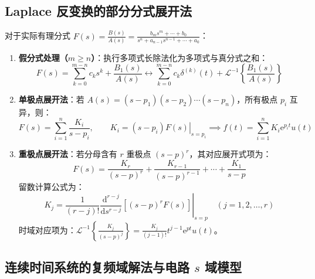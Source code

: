 \documentclass[11pt,a4paper,fontset=fandol]{ctexart}
\theoremstyle{remark}
\begin{document}
\subsection{Laplace 反变换的部分分式展开法}
对于实际有理分式 $F(s) = \frac{B(s)}{A(s)} = \frac{b_m s^m + \cdots + b_0}{s^n + a_{n-1}s^{n-1} + \cdots + a_0}$：
\begin{enumerate}
    \item \textbf{假分式处理（$m \ge n$）}：执行多项式长除法化为多项式与真分式之和：
    \begin{equation}
        F(s) = \sum_{k=0}^{m-n} c_k s^k + \frac{B_1(s)}{A(s)} \longleftrightarrow \sum_{k=0}^{m-n} c_k \delta^{(k)}(t) + \mathcal{L}^{-1}\left\{ \frac{B_1(s)}{A(s)} \right\}
    \end{equation}
    \item \textbf{单极点展开法}：若 $A(s) = (s - p_1)(s - p_2)\cdots(s - p_n)$，所有极点 $p_i$ 互异，则：
    \begin{equation}
        F(s) = \sum_{i=1}^n \frac{K_i}{s - p_i}, \qquad K_i = \left. (s - p_i)F(s) \right|_{s = p_i} \implies f(t) = \sum_{i=1}^n K_i \mathrm{e}^{p_i t} u(t)
    \end{equation}
    \item \textbf{重极点展开法}：若分母含有 $r$ 重极点 $(s - p)^r$，其对应展开式项为：
    \begin{equation}
        F(s) = \frac{K_{r}}{(s - p)^r} + \frac{K_{r-1}}{(s - p)^{r-1}} + \cdots + \frac{K_1}{s - p}
    \end{equation}
    留数计算公式为：
    \begin{equation}
        K_j = \frac{1}{(r - j)!} \left. \frac{\mathrm{d}^{r - j}}{\mathrm{d}s^{r - j}} \left[ (s - p)^r F(s) \right] \right|_{s = p} \quad (j = 1, 2, \dots, r)
    \end{equation}
    时域对应项为：$\mathcal{L}^{-1}\left\{ \frac{K_j}{(s - p)^j} \right\} = \frac{K_j}{(j - 1)!} t^{j-1}\mathrm{e}^{pt} u(t)$。
\end{enumerate}

\subsection{连续时间系统的复频域解法与电路 $s$ 域模型}
\end{document}
